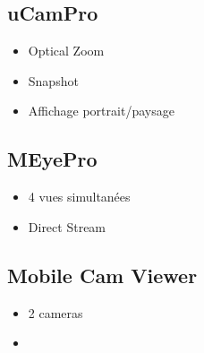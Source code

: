 \documentclass[a4paper,10pt]{report}
\begin{document}
\subsection{uCamPro}
\begin{itemize}
  \item Optical Zoom
  \item Snapshot
  \item Affichage portrait/paysage
\end{itemize}

\subsection{MEyePro}
\begin{itemize}
  \item 4 vues simultanées
  \item Direct Stream
\end{itemize}


\subsection{Mobile Cam Viewer}
\begin{itemize}
  \item 2 cameras
  \item
\end{itemize}
\end{document}
